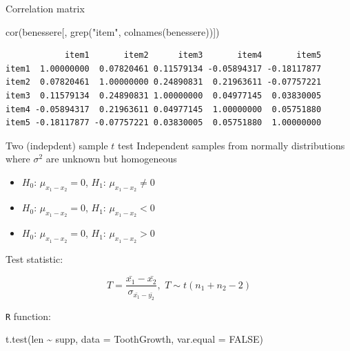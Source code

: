 \documentclass[
  ignorenonframetext,
]{beamer}
\newenvironment{Shaded}{\begin{snugshade}}{\end{snugshade}}
\newcommand{\AttributeTok}[1]{\textcolor[rgb]{0.00,0.34,0.68}{#1}}
\newcommand{\ConstantTok}[1]{\textcolor[rgb]{0.67,0.33,0.00}{#1}}
\newcommand{\FunctionTok}[1]{\textcolor[rgb]{0.39,0.29,0.61}{#1}}
\newcommand{\NormalTok}[1]{\textcolor[rgb]{0.12,0.11,0.11}{#1}}
\newcommand{\SpecialCharTok}[1]{\textcolor[rgb]{0.24,0.68,0.91}{#1}}
\newcommand{\StringTok}[1]{\textcolor[rgb]{0.75,0.01,0.01}{#1}}
\providecommand{\tightlist}{%
  \setlength{\itemsep}{0pt}\setlength{\parskip}{0pt}}
\begin{document}
\begin{frame}[fragile]{Correlation matrix}
\protect\hypertarget{correlation-matrix}{}
\begin{Shaded}
\begin{Highlighting}[]
\FunctionTok{cor}\NormalTok{(benessere[, }\FunctionTok{grep}\NormalTok{(}\StringTok{"item"}\NormalTok{, }\FunctionTok{colnames}\NormalTok{(benessere))])}
\end{Highlighting}
\end{Shaded}

\begin{verbatim}
            item1       item2      item3       item4       item5
item1  1.00000000  0.07820461 0.11579134 -0.05894317 -0.18117877
item2  0.07820461  1.00000000 0.24890831  0.21963611 -0.07757221
item3  0.11579134  0.24890831 1.00000000  0.04977145  0.03830005
item4 -0.05894317  0.21963611 0.04977145  1.00000000  0.05751880
item5 -0.18117877 -0.07757221 0.03830005  0.05751880  1.00000000
\end{verbatim}
\end{frame}

\begin{frame}[fragile]{Two (indepdent) sample \(t\) test}
\protect\hypertarget{two-indepdent-sample-t-test}{}
Independent samples from normally distributions where \(\sigma^2\) are
unknown but homogeneous

\begin{itemize}
\tightlist
\item
  \(H_0\): \(\mu_{x_1 - x_2} = 0\), \(H_1\): \(\mu_{x_1 - x_2} \neq 0\)
\item
  \(H_0\): \(\mu_{x_1 - x_2} = 0\), \(H_1\): \(\mu_{x_1 - x_2} < 0\)
\item
  \(H_0\): \(\mu_{x_1 - x_2} = 0\), \(H_1\): \(\mu_{x_1 - x_2} > 0\)
\end{itemize}

Test statistic:

\[T = \frac{\bar{x_1} - \bar{x_2}}{\sigma_{\bar{x_1}-\bar{y_2}}}, \, \, T \sim t(n_1 + n_2 - 2)\]

\texttt{R} function:

\begin{Shaded}
\begin{Highlighting}[]
\FunctionTok{t.test}\NormalTok{(len }\SpecialCharTok{\textasciitilde{}}\NormalTok{ supp, }\AttributeTok{data =}\NormalTok{ ToothGrowth, }
       \AttributeTok{var.equal =} \ConstantTok{FALSE}\NormalTok{)}
\end{Highlighting}
\end{Shaded}
\end{frame}
\end{document}
